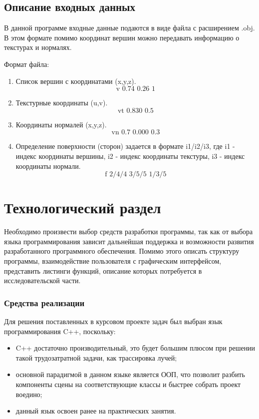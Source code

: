 \documentclass[12pt,a4paper,oneside]{report}
\begin{document}
	\section{Описание входных данных}
	 \quad В данной программе входные данные подаются в виде файла с расширением .obj. В этом формате помимо координат вершин можно передавать информацию о текстурах и нормалях. 	
	
	 Формат файла:
	
	\begin{enumerate}
		\item Список вершин с координатами (x,y,z).
		$$ \text{v 0.74 0.26 1} $$
		\item Текстурные координаты (u,v).
		$$ \text{vt 0.830 0.5} $$
		\item Координаты нормалей (x,y,z).
		$$ \text{vn 0.7 0.000 0.3} $$
		\item Определение поверхности (сторон) задается в формате i1/i2/i3, где i1 - индекс координаты вершины, i2 - индекс координаты текстуры, i3 - индекс координаты нормали.
		$$ \text{f 2/4/4 3/5/5 1/3/5} $$
	\end{enumerate}
		
	\chapter{Технологический раздел}
	 \quad Необходимо произвести выбор средств разработки программы, так как от выбора языка программирования зависит дальнейшая поддержка и возможности развития разработанного программного обеспечения. Помимо этого описать структуру программы, взаимодействие пользователя с графическим интерфейсом, представить листинги функций, описание которых потребуется в исследовательской части.
	
	\subsection{Средства реализации}
	 \quad Для решения поставленных в курсовом проекте задач был выбран язык программирования C++, поскольку:
	\begin{itemize}
		\item C++ достаточно производительный, это будет большим плюсом при решении такой трудозатратной задачи, как трассировка лучей;
		\item основной парадигмой в данном языке является ООП, что позволит разбить компоненты сцены на соответствующие классы и быстрее собрать проект воедино; 
		\item данный язык освоен ранее на практических занятия.
	\end{itemize}
\end{document}
